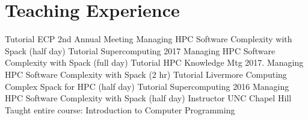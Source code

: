 \section{Teaching Experience}
		{Tutorial}
		{ECP 2nd Annual Meeting}{}
		{Managing HPC Software Complexity with Spack (half day)}{}
		{Tutorial}
		{Supercomputing 2017}{}
		{Managing HPC Software Complexity with Spack (full day)}{}
		{Tutorial}
		{HPC Knowledge Mtg 2017.}{}
		{Managing HPC Software Complexity with Spack (2 hr)}{}
		{Tutorial}
		{Livermore Computing Complex}{}
		{Spack for HPC (half day)}{}
		{Tutorial}
		{Supercomputing 2016}{}
		{Managing HPC Software Complexity with Spack (half day)}{}
		{Instructor}
		{UNC Chapel Hill}{}
		{Taught entire course: Introduction to Computer Programming}{}
